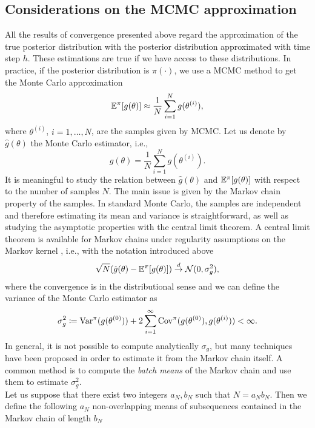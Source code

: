 \subsection{Considerations on the MCMC approximation}

All the results of convergence presented above regard the approximation of the true posterior distribution with the posterior distribution approximated with time step $h$. These estimations are true if we have access to these distributions. In practice, if the posterior distribution is $\pi(\cdot)$, we use a MCMC method to get the Monte Carlo approximation
\begin{equation}
	\mathbb{E}^\pi[g(\theta)] \approx \frac{1}{N} \sum_{i = 1}^{N} g(\theta^{(i)}),
\end{equation}
where $\theta^{(i)}$, $i = 1, \ldots, N$, are the samples given by MCMC. Let us denote by $\hat g(\theta)$ the Monte Carlo estimator, i.e.,
\begin{equation}
	\hat g(\theta) = \frac{1}{N} \sum_{i = 1}^{N} g(\theta^{(i)}).
\end{equation} 
It is meaningful to study the relation between $\hat g(\theta)$ and $\mathbb{E}^\pi[g(\theta)]$ with respect to the number of samples $N$. The main issue is given by the Markov chain property of the samples. In standard Monte Carlo, the samples are independent and therefore estimating its mean and variance is straightforward, as well as studying the asymptotic properties with the central limit theorem. A central limit theorem is available for Markov chains under regularity assumptions on the Markov kernel \cite{Jon04}, i.e., with the notation introduced above
\begin{equation}\label{eq:CLTMarkov}
	\sqrt{N}(\hat g(\theta) - \mathbb{E}^\pi[g(\theta)]) \stackrel{d}{\to} \mathcal{N}(0, \sigma^2_g),
\end{equation}
where the convergence is in the distributional sense and we can define the variance of the Monte Carlo estimator as
\begin{equation}
\sigma^2_g \coloneqq \operatorname{Var}^\pi(g(\theta^{(0)})) + 2\sum_{i = 1}^{\infty} \mathrm{Cov}^\pi(g(\theta^{(0)}), g(\theta^{(i)})) < \infty.
\end{equation}
In general, it is not possible to compute analytically $\sigma_g$, but many techniques have been proposed in order to estimate it from the Markov chain itself. A common method \cite{FlJ10} is to compute the \textit{batch means} of the Markov chain and use them to estimate $\sigma^2_g$. \\
Let us suppose that there exist two integers $a_N, b_N$ such that $N = a_Nb_N$. Then we define the following $a_N$ non-overlapping means of subsequences contained in the Markov chain of length $b_N$

